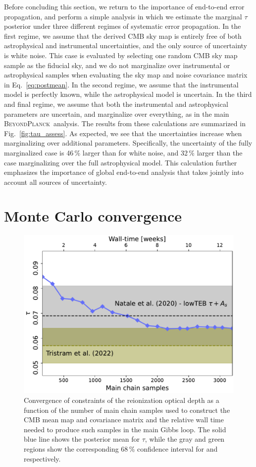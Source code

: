 \documentclass[onecolumn]{aa}
\newcommand{\BP}{\textsc{BeyondPlanck}}
\begin{document}
Before concluding this section, we return to the importance of
end-to-end error propagation, and perform a simple analysis in which
we estimate the marginal $\tau$ posterior under three different regimes
of systematic error propagation. In the first regime, we
assume that the derived CMB sky map is entirely free of both
astrophysical and instrumental uncertainties, and the only source of
uncertainty is white noise. This case is evaluated by selecting one
random CMB sky map sample as the fiducial sky, and we do not
marginalize over instrumental or astrophysical samples when evaluating
the sky map and noise covariance matrix in Eq.~\eqref{eq:postmean}. In the second
regime, we assume that the instrumental model is perfectly known,
while the astrophysical model is uncertain. In the third and final
regime, we assume that both the instrumental and astrophysical
parameters are uncertain, and marginalize over everything, as in the
main \BP\ analysis. The results from these calculations are summarized
in Fig.~\ref{fig:tau_assess}. As expected, we see that the
uncertainties increase when marginalizing over additional
parameters. Specifically, the uncertainty of the fully marginalized
case is 46\,\% larger than for white noise, and 32\,\% larger than the
case marginalizing over the full astrophysical model. This calculation
further emphasizes the importance of global end-to-end analysis that
takes jointly into account all sources of uncertainty. 


\section{Monte Carlo convergence}
\label{sec:convergence}

\begin{figure}[t]
  \center
  \includegraphics[width=0.7\linewidth]{figs/BP10_lowl_tau_R18_Tbp10_burnin200s_regP05.pdf}
  \caption{Convergence of constraints of the reionization optical depth as 
    a function of the number of main chain samples used to
    construct the CMB mean map and covariance matrix and the relative wall time needed
    to produce such samples in the main Gibbs loop. 
    The solid blue line shows the posterior mean for $\tau$, while the gray and green 
    regions show the corresponding 68\,\% confidence interval for \citet{natale:2020} and \citet{tristram:2021} respectively.}
    \label{fig:convergence}
\end{figure}
\end{document}
